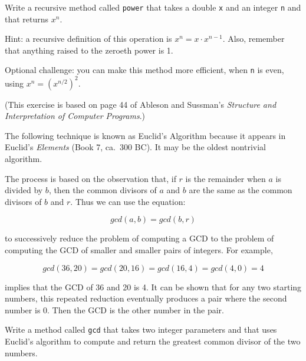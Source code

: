 \documentclass[12pt]{book}
\begin{document}
\begin{exercise}
\label{ex.power}
Write a recursive method called {\tt power} that takes a double {\tt x} and an integer {\tt n} and that returns $x^n$.

Hint: a recursive definition of this operation is $x^n = x \cdot x^{n-1}$.
Also, remember that anything raised to the zeroeth power is 1.

Optional challenge: you can make this method more efficient, when {\tt n} is even, using $x^n = \left( x^{n/2} \right)^2$.
\end{exercise}

\begin{exercise}
\label{gcd}
(This exercise is based on page 44 of Ableson and Sussman's {\em Structure and Interpretation of Computer Programs}.)

The following technique is known as Euclid's Algorithm because it appears in Euclid's {\em Elements} (Book 7, ca.~300 BC).
It may be the oldest nontrivial algorithm.

The process is based on the observation that, if $r$ is the remainder when $a$ is divided by $b$, then the common divisors of $a$ and $b$ are the same as the common divisors of $b$ and $r$.
Thus we can use the equation:

\[ gcd(a, b) = gcd(b, r) \]

to successively reduce the problem of computing a GCD to the problem of computing the GCD of smaller and smaller pairs of integers.
For example,

\[ gcd(36, 20) = gcd(20, 16) = gcd(16, 4) = gcd(4, 0) = 4 \]

implies that the GCD of 36 and 20 is 4.
It can be shown that for any two starting numbers, this repeated reduction eventually produces a pair where the second number is 0.
Then the GCD is the other number in the pair.

Write a method called {\tt gcd} that takes two integer parameters and that uses Euclid's algorithm to compute and return the greatest common divisor of the two numbers.
\end{exercise}
\end{document}
